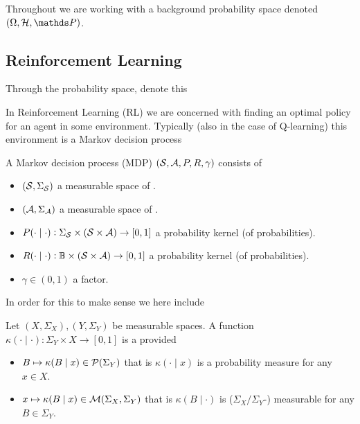 
Throughout we are working with a background probability space
denoted $(\Omega, \Cal{H}, \Prob)$.

\subsection{Reinforcement Learning}

Through the  probability space, denote this

In Reinforcement Learning (RL) we are concerned with finding an optimal policy
for an agent in some environment.
Typically (also in the case of Q-learning) this environment is a
Markov decision process

\begin{defn}
	A Markov decision process (MDP) $(\mathcal{S}, \mathcal{A}, P, R, \gamma)$
	consists of
\begin{itemize}
  \item $(\mathcal{S}, \Sigma_{\mathcal{S}})$ a measurable space of .
  \item $(\mathcal{A}, \Sigma_{\mathcal{A}})$ a measurable space of .
  \item $P(\cdot \mid \cdot) : \Sigma_{\mathcal{S}} \times (\mathcal{S} \times \mathcal{A})
    \to [0,1]$ a probability kernel (of  probabilities).
  \item $R(\cdot \mid \cdot) : \mathbb{B} \times (\mathcal{S} \times \mathcal{A})
    \to [0,1]$ a probability kernel (of  probabilities).
  \item $\gamma \in (0,1)$ a  factor.
\end{itemize}
\end{defn}

In order for this to make sense we here include
\begin{defn}
  Let $(X, \Sigma_X), (Y, \Sigma_Y)$ be measurable spaces.
  A function $\kappa(\cdot \mid \cdot) : \Sigma_Y \times X \to [0,1]$
  is a  provided
  \begin{itemize}
    \item $B \mapsto \kappa(B \mid x) \in \mathcal{P}(\Sigma_Y)$
      that is $\kappa(\cdot \mid x)$ is a probability measure
      for any $x \in X$.
    \item $x \mapsto \kappa(B \mid x) \in \mathcal{M}(\Sigma_X, \Sigma_Y)$
      that is $\kappa(B \mid \cdot)$ is ($\Sigma_X/\Sigma_Y$-) measurable
      for any $B \in \Sigma_Y$.
  \end{itemize}
\end{defn}

